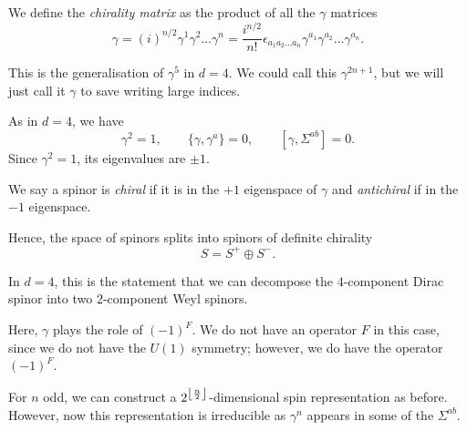 \begin{definition}
  We define the \emph{chirality matrix} as the product of all the $\gamma$  matrices
  \begin{equation}
    \label{eq:chirality}
    \gamma = (i)^{n / 2} \gamma^1 \gamma^2 \dots \gamma^{n} = \frac{i^{n / 2}}{n!} \epsilon_{a_1 a_2 \dots a_n} \gamma^{a_1} \gamma^{a_2} \dots \gamma^{a_n}.
  \end{equation}
\end{definition}
\begin{remark}
  This is the generalisation of $\gamma^5$ in $d = 4$. We could call this $\gamma^{2n+1}$, but we will just call it $\gamma$ to save writing large indices.
\end{remark}
As in $d = 4$, we have
 \begin{equation}
  \gamma^2 = 1, \qquad \{\gamma, \gamma^{a}\} = 0, \qquad [\gamma, \Sigma^{ab}] = 0.
\end{equation}
Since $\gamma^2 = 1$, its eigenvalues are  $\pm 1$.
\begin{definition}[]
  We say a spinor is \emph{chiral} if it is in the $+1$ eigenspace of $\gamma$ and \emph{antichiral} if in the $-1$ eigenspace.
\end{definition}
Hence, the space of spinors splits into spinors of definite chirality
\begin{equation}
  S = S^+ \oplus S^-.
\end{equation}
\begin{remark}
  In $d = 4$, this is the statement that we can decompose the $4$-component Dirac spinor into two $2$-component Weyl spinors.
\end{remark}
Here, $\gamma$ plays the role of $(-1)^F$.
We do not have an operator $F$ in this case, since we do not have the $U(1)$ symmetry; however, we do have the operator $(-1)^F$.
\begin{remark}
  For $n$ odd, we can construct a $2^{\floor*{\frac{n}{2}}}$-dimensional spin representation as before.
  However, now this representation is irreducible as $\gamma^n$ appears in some of the $\Sigma^{ab}$.
\end{remark}

